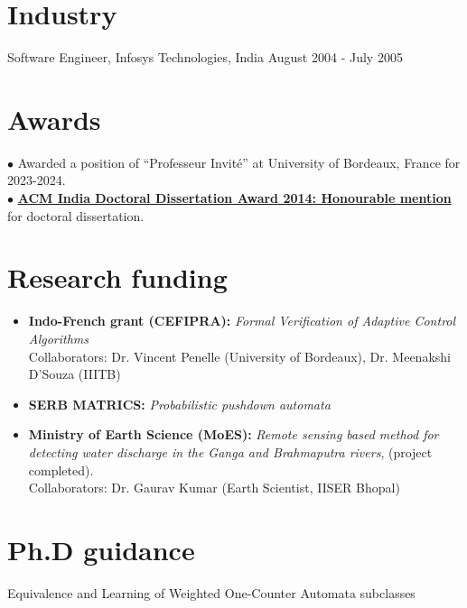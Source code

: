 \documentclass[11pt,a4paper,sans]{moderncv} %
\begin{document}
\section{Industry }
Software Engineer, Infosys Technologies, India \hfill August 2004 - July 2005

\section{Awards}
$\bullet$ Awarded a position of ``Professeur Invit\'e'' at University of Bordeaux, France for 2023-2024. \\
$\bullet$ \href{http://awards.acm.org/award_winners/sreejith_9923861.cfm}{{\textbf{ACM India Doctoral Dissertation Award 2014: Honourable mention}}} for doctoral dissertation.


				
\section{Research funding}
\begin{itemize}
 \item \textbf{Indo-French grant (CEFIPRA):} \emph{Formal Verification of Adaptive Control Algorithms}
\iflong
\\
 Collaborators: Dr. Vincent Penelle (University of Bordeaux), Dr. Meenakshi D’Souza (IIITB)
\fi
\item \textbf{SERB MATRICS:} \emph{Probabilistic pushdown automata}
\item \textbf{Ministry of Earth Science (MoES):} \emph{Remote sensing based method for detecting water discharge in the Ganga and Brahmaputra rivers}, (project completed).
\iflong
\\
Collaborators: Dr. Gaurav Kumar (Earth Scientist, IISER Bhopal)
\fi
\end{itemize}


\section{Ph.D guidance}
 {Equivalence and Learning of Weighted One-Counter Automata subclasses}
\iflong
\end{document}
